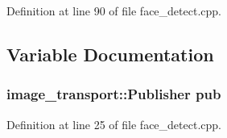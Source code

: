 Definition at line 90 of file face\-\_\-detect.\-cpp.



\subsection{Variable Documentation}
\subsubsection[{pub}]{\setlength{\rightskip}{0pt plus 5cm}image\-\_\-transport\-::\-Publisher pub}\label{face__detect_8cpp_aa3018a2730fde05a0032471af5d5dff2}


Definition at line 25 of file face\-\_\-detect.\-cpp.

